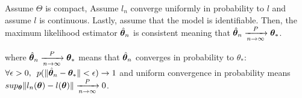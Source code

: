 \begin{prop}
  \label{prop:mse_consistent}
  Assume $\Theta$ is compact, 
  Assume $l_n$ converge uniformly in probability to $l$
  and assume $l$ is continuous.
  Lastly, assume that the model is identifiable.
  Then, the maximum likelihood estimator  $\hat{\boldsymbol{\theta}}_n$ is consistent
  meaning that $\hat{\boldsymbol{\theta}}_n \xrightarrow[n \rightarrow \infty]{P}  \boldsymbol{\theta}_*$.
\end{prop}
where $\hat{\boldsymbol{\theta}}_n \xrightarrow[n \rightarrow \infty]{P}  \boldsymbol{\theta}_*$ means
that $\hat{\boldsymbol{\theta}}_n$ converges in probability to $\theta_*$:  $\forall \epsilon > 0, \enspace p(\| \hat{\boldsymbol{\theta}}_n - \boldsymbol{\theta}_* \| < \epsilon) \rightarrow 1$
and uniform convergence in probability means $sup_{\boldsymbol{\theta}} \|l_n(\boldsymbol{\theta}) -
l(\boldsymbol{\theta})\| \xrightarrow[n \rightarrow \infty]{P} 0$.
